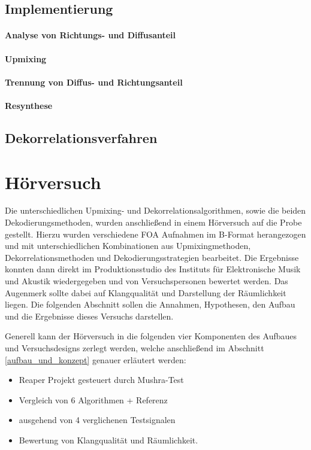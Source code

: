 \documentclass[12pt, a4paper]{article}
\begin{document}
    \subsection{Implementierung}
    
        \paragraph{Analyse von Richtungs- und Diffusanteil}
        
        \paragraph{Upmixing}
        
        \paragraph{Trennung von Diffus- und Richtungsanteil}
        
        \paragraph{Resynthese}
        

    \subsection{Dekorrelationsverfahren} \label{dekorrelation}
    

\newpage

\section{Hörversuch}
Die unterschiedlichen Upmixing- und Dekorrelationsalgorithmen, sowie die beiden Dekodierungsmethoden, wurden anschließend in einem Hörversuch auf die Probe gestellt. Hierzu wurden verschiedene FOA Aufnahmen im B-Format herangezogen und mit unterschiedlichen Kombinationen aus Upmixingmethoden, Dekorrelationsmethoden und Dekodierungsstrategien bearbeitet. Die Ergebnisse konnten dann direkt im Produktionsstudio des Instituts für Elektronische Musik und Akustik wiedergegeben und von Versuchspersonen bewertet werden. Das Augenmerk sollte dabei auf Klangqualität und Darstellung der Räumlichkeit liegen. Die folgenden Abschnitt sollen die Annahmen, Hypothesen, den Aufbau und die Ergebnisse dieses Versuchs darstellen.

Generell kann der Hörversuch in die folgenden vier Komponenten des Aufbaues und Versuchsdesigns zerlegt werden, welche anschließend im Abschnitt \ref{aufbau_und_konzept} genauer erläutert werden:
\begin{itemize}
    \item Reaper Projekt gesteuert durch Mushra-Test
    \item Vergleich von 6 Algorithmen + Referenz
    \item ausgehend von 4 verglichenen Testsignalen
    \item Bewertung von Klangqualität und Räumlichkeit.
\end{itemize}
\end{document}
